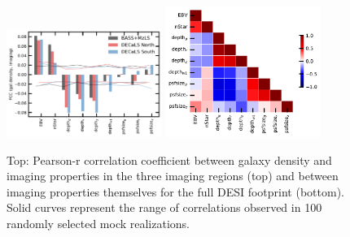 \begin{figure}
    \includegraphics[width=0.45\textwidth]{figures/pcc.pdf} 
    \includegraphics[width=0.45\textwidth]{figures/pccx.pdf}     
    \caption{Top: Pearson-r correlation coefficient between galaxy density and imaging properties in the three imaging regions (top) and between imaging properties themselves for the full DESI footprint (bottom). Solid curves represent the range of correlations observed in 100 randomly selected mock realizations.}
    \label{fig:pcc}
\end{figure}
